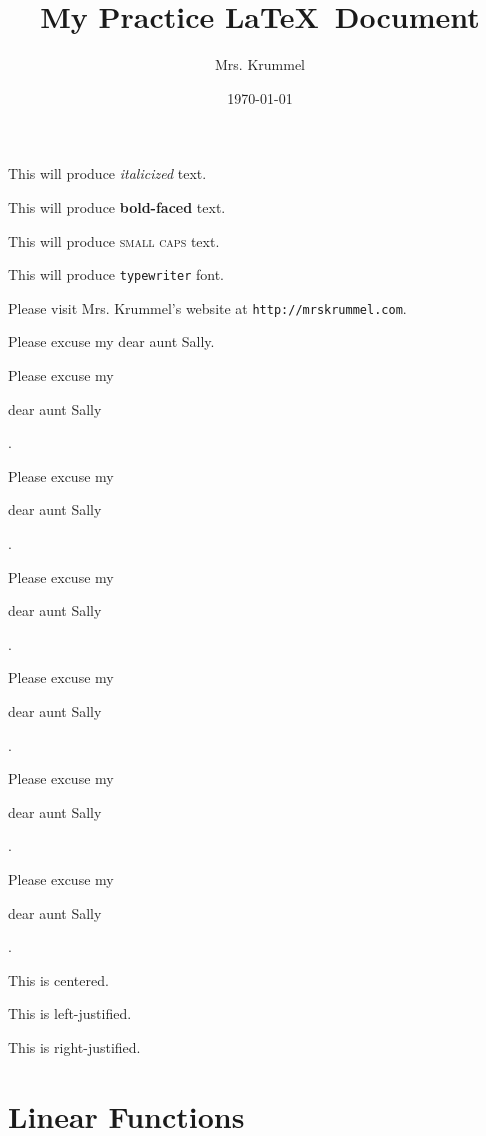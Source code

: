 \documentclass[11pt]{article}
\begin{document}
\tableofcontents

\title{My Practice \LaTeX \ Document}
\author{Mrs. Krummel}
\date{\today}
\maketitle

This will produce \textit{italicized} text.

This will produce \textbf{bold-faced} text.

This will produce \textsc{small caps} text.

This will produce \texttt{typewriter} font.

Please visit Mrs. Krummel's website at \texttt{http://mrskrummel.com}.

Please excuse my dear aunt Sally.

Please excuse my \begin{large}dear aunt Sally\end{large}.

Please excuse my \begin{Large}dear aunt Sally\end{Large}.

Please excuse my \begin{huge}dear aunt Sally\end{huge}.

Please excuse my \begin{Huge}dear aunt Sally\end{Huge}.

Please excuse my \begin{small}dear aunt Sally\end{small}.

Please excuse my \begin{tiny}dear aunt Sally\end{tiny}.

\begin{center}This is centered.\end{center}

\begin{flushleft}This is left-justified.\end{flushleft}

\begin{flushright}This is right-justified.\end{flushright}

\section{Linear Functions}
\end{document}
